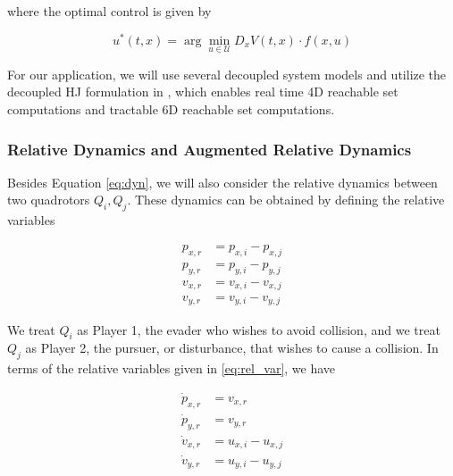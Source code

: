 \noindent where the optimal control is given by

\begin{equation} \label{eq:HJB_ctrl_syn}
u^*(t,x) = \arg \min_{u\in\mathcal{U}} D_x V(t,x) \cdot f(x,u)
\end{equation}

For our application, we will use several decoupled system models and utilize the decoupled HJ formulation in \cite{Chen15}, which enables real time 4D reachable set computations and tractable 6D reachable set computations.

\subsubsection{Relative Dynamics and Augmented Relative Dynamics}
Besides Equation \eqref{eq:dyn}, we will also consider the relative dynamics between two quadrotors $Q_i,Q_j$. These dynamics can be obtained by defining the relative variables

\begin{equation} \label{eq:rel_var}
\begin{aligned}
p_{x,r} &= p_{x,i} - p_{x,j} \\
p_{y,r} &= p_{y,i} - p_{y,j}\\
v_{x,r} &= v_{x,i} - v_{x,j}\\
v_{y,r} &= v_{y,i} - v_{y,j}
\end{aligned}
\end{equation}

We treat $Q_i$ as Player 1, the evader who wishes to avoid collision, and we treat $Q_j$ as Player 2, the pursuer, or disturbance, that wishes to cause a collision. In terms of the relative variables given in \eqref{eq:rel_var}, we have 

\begin{equation} \label{eq:rel_dyn}
\begin{aligned}
\dot{p}_{x,r} &= v_{x,r} \\
\dot{p}_{y,r} &= v_{y,r} \\
\dot{v}_{x,r} &= u_{x,i} - u_{x,j} \\
\dot{v}_{y,r} &= u_{y,i} - u_{y,j}
\end{aligned}
\end{equation}


